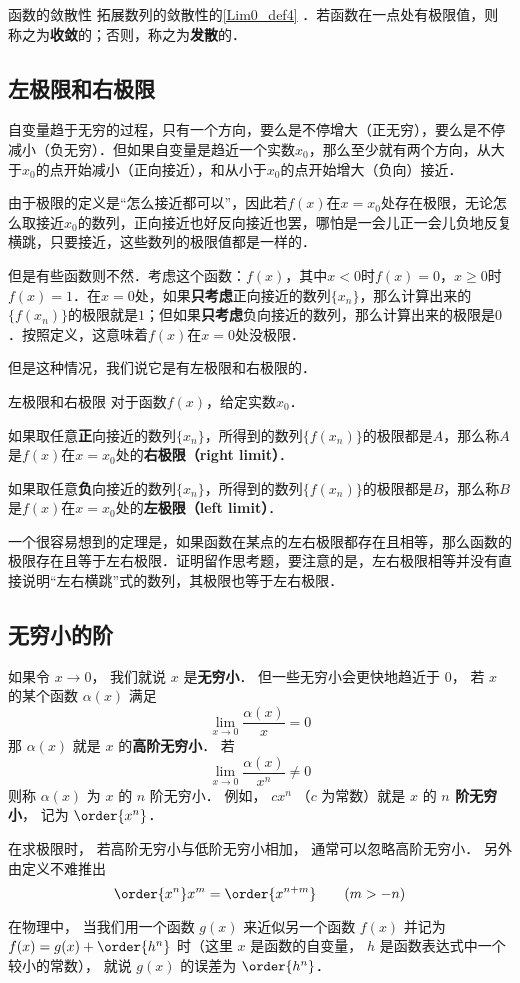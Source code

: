 \begin{definition}{函数的敛散性}
拓展数列的敛散性的\autoref{Lim0_def4} ．若函数在一点处有极限值，则称之为\textbf{收敛}的；否则，称之为\textbf{发散}的．
\end{definition}

\subsection{左极限和右极限}

自变量趋于无穷的过程，只有一个方向，要么是不停增大（正无穷），要么是不停减小（负无穷）．但如果自变量是趋近一个实数$x_0$，那么至少就有两个方向，从大于$x_0$的点开始减小（正向接近），和从小于$x_0$的点开始增大（负向）接近．

由于极限的定义是“怎么接近都可以”，因此若$f(x)$在$x=x_0$处存在极限，无论怎么取接近$x_0$的数列，正向接近也好反向接近也罢，哪怕是一会儿正一会儿负地反复横跳，只要接近，这些数列的极限值都是一样的．

但是有些函数则不然．考虑这个函数：$f(x)$，其中$x<0$时$f(x)=0$，$x\geq 0$时$f(x)=1$．在$x=0$处，如果\textbf{只考虑}正向接近的数列$\{x_n\}$，那么计算出来的$\{f(x_n)\}$的极限就是$1$；但如果\textbf{只考虑}负向接近的数列，那么计算出来的极限是$0$．按照定义，这意味着$f(x)$在$x=0$处没极限．

但是这种情况，我们说它是有左极限和右极限的．

\begin{definition}{左极限和右极限}
对于函数$f(x)$，给定实数$x_0$．

如果取任意\textbf{正}向接近的数列$\{x_n\}$，所得到的数列$\{f(x_n)\}$的极限都是$A$，那么称$A$是$f(x)$在$x=x_0$处的\textbf{右极限（right limit）}．

如果取任意\textbf{负}向接近的数列$\{x_n\}$，所得到的数列$\{f(x_n)\}$的极限都是$B$，那么称$B$是$f(x)$在$x=x_0$处的\textbf{左极限（left limit）}．
\end{definition}

一个很容易想到的定理是，如果函数在某点的左右极限都存在且相等，那么函数的极限存在且等于左右极限．证明留作思考题，要注意的是，左右极限相等并没有直接说明“左右横跳”式的数列，其极限也等于左右极限．





\subsection{无穷小的阶}
如果令 $x\to 0$， 我们就说 $x$ 是\textbf{无穷小}． 但一些无穷小会更快地趋近于 $0$， 若 $x$ 的某个函数 $\alpha(x)$ 满足
\begin{equation}
\lim_{x\to 0} \frac{\alpha(x)}{x} = 0
\end{equation}
那 $\alpha(x)$ 就是 $x$ 的\textbf{高阶无穷小}． 若
\begin{equation}
\lim_{x\to 0} \frac{\alpha(x)}{x^n} \ne 0
\end{equation}
则称 $\alpha(x)$ 为 $x$ 的 $n$ 阶无穷小． 例如， $c x^n$ （$c$ 为常数）就是 $x$ 的 \textbf{$n$ 阶无穷小}， 记为 $\order{x^n}$．

在求极限时， 若高阶无穷小与低阶无穷小相加， 通常可以忽略高阶无穷小． 另外由定义不难推出
\begin{equation}
\order{x^n} x^m = \order{x^{n + m}} \qquad (m > -n)
\end{equation}

在物理中， 当我们用一个函数 $g(x)$ 来近似另一个函数 $f(x)$ 并记为 $f(x) = g(x) + \order{h^n}$ 时（这里 $x$ 是函数的自变量， $h$ 是函数表达式中一个较小的常数）， 就说 $g(x)$ 的误差为 $\order{h^n}$．
